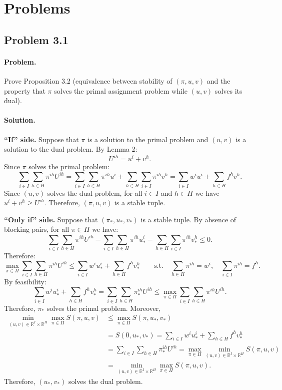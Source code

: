 \section{Problems}
\subsection{Problem 3.1}
\paragraph{Problem.} Prove Proposition 3.2 (equivalence between stability of $(\pi, u, v)$ and the property that $\pi$ solves the primal assignment problem while $(u, v)$ solves its dual).

\paragraph{Solution.}
\textbf{``If'' side.} Suppose that $\pi$ is a solution to the primal problem and $(u, v)$ is a solution to the dual problem. By Lemma 2:
\[
U^{ih} = u^i + v^h.
\]
Since $\pi$ solves the primal problem:
\[
\sum_{i \in I} \sum_{h \in H} \pi^{ih} U^{ih}
= \sum_{i \in I} \sum_{h \in H} \pi^{ih} u^i + \sum_{h \in H} \sum_{i \in I} \pi^{ih} v^h
= \sum_{i \in I} w^i u^i + \sum_{h \in H} f^h v^h.
\]
Since $(u, v)$ solves the dual problem, for all $i \in I$ and $h \in H$ we have $u^i + v^h \geq U^{ih}$. Therefore, $(\pi, u, v)$ is a stable tuple.

\textbf{``Only if'' side.} Suppose that $(\pi_*, u_*, v_*)$ is a stable tuple. By absence of blocking pairs, for all $\pi \in \Pi$ we have:
\[
\sum_{i \in I} \sum_{h \in H} \pi^{ih} U^{ih} - \sum_{i \in I} \sum_{h \in H} \pi^{ih} u_*^i - \sum_{h \in H} \sum_{i \in I} \pi^{ih} v_*^h \leq 0.
\]
Therefore:
\[
\max_{\pi \in \Pi} \sum_{i \in I} \sum_{h \in H} \pi^{ih} U^{ih}
\leq \sum_{i \in I} w^i u_*^i + \sum_{h \in H} f^h v_*^h
\qquad \text{s.t.} \quad
\sum_{h \in H} \pi^{ih} = w^i, \quad \sum_{i \in I} \pi^{ih} = f^h.
\]
By feasibility:
\[
\sum_{i \in I} w^i u_*^i + \sum_{h \in H} f^h v_*^h
= \sum_{i \in I} \sum_{h \in H} \pi_*^{ih} U^{ih}
\leq \max_{\pi \in \Pi} \sum_{i \in I} \sum_{h \in H} \pi^{ih} U^{ih}.
\]
Therefore, $\pi_*$ solves the primal problem. Moreover,
\begin{align*}
\min_{(u,v) \in \mathbb{R}^I \times \mathbb{R}^H} \max_{\pi \in \Pi} S(\pi, u, v)
& \leq \max_{\pi \in \Pi} S(\pi, u_*, v_*) \\
& = S(0, u_*, v_*)
= \sum_{i \in I} w^i u_*^i + \sum_{h \in H} f^h v_*^h \\
& = \sum_{i \in I} \sum_{h \in H} \pi_*^{ih} U^{ih}
= \max_{\pi \in \Pi} \min_{(u,v) \in \mathbb{R}^I \times \mathbb{R}^H} S(\pi, u, v) \\
& = \min_{(u,v) \in \mathbb{R}^I \times \mathbb{R}^H} \max_{\pi \in \Pi} S(\pi, u, v).
\end{align*}
Therefore, $(u_*, v_*)$ solves the dual problem.


